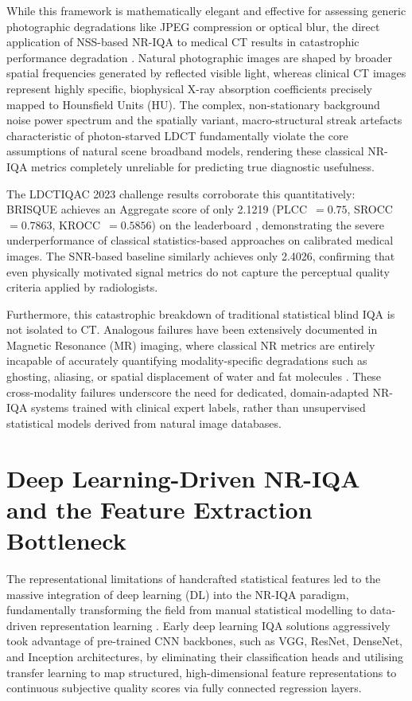 While this framework is mathematically elegant and effective for assessing generic
photographic degradations like JPEG compression or optical blur, the direct application of
NSS-based NR-IQA to medical CT results in catastrophic performance degradation
\cite{athar2019comprehensive}. Natural photographic images are shaped by broader spatial
frequencies generated by reflected visible light, whereas clinical CT images represent
highly specific, biophysical X-ray absorption coefficients precisely mapped to Hounsfield
Units (HU). The complex, non-stationary background noise power spectrum and the
spatially variant, macro-structural streak artefacts characteristic of photon-starved
LDCT fundamentally violate the core assumptions of natural scene broadband models,
rendering these classical NR-IQA metrics completely unreliable for predicting true
diagnostic usefulness.

The LDCTIQAC 2023 challenge results corroborate this quantitatively: BRISQUE achieves an
Aggregate score of only 2.1219 (PLCC~$= 0.75$, SROCC~$= 0.7863$, KROCC~$= 0.5856$)
on the leaderboard \cite{lee2025ldctiqac}, demonstrating the severe underperformance of
classical statistics-based approaches on calibrated medical images. The SNR-based baseline
similarly achieves only 2.4026, confirming that even physically motivated signal metrics
do not capture the perceptual quality criteria applied by radiologists.

Furthermore, this catastrophic breakdown of traditional statistical blind IQA is not
isolated to CT. Analogous failures have been extensively documented in Magnetic Resonance
(MR) imaging, where classical NR metrics are entirely incapable of accurately quantifying
modality-specific degradations such as ghosting, aliasing, or spatial displacement of
water and fat molecules \cite{stepien2023mri}. These cross-modality failures underscore
the need for dedicated, domain-adapted NR-IQA systems trained with clinical expert labels,
rather than unsupervised statistical models derived from natural image databases.


\section{Deep Learning-Driven NR-IQA and the Feature Extraction Bottleneck}
\label{sec:lit_dl_iqa}

The representational limitations of handcrafted statistical features led to the massive
integration of deep learning (DL) into the NR-IQA paradigm, fundamentally transforming
the field from manual statistical modelling to data-driven representation learning
\cite{ahmed2024iqanrtl}. Early deep learning IQA solutions aggressively took advantage
of pre-trained CNN backbones, such as VGG, ResNet, DenseNet, and Inception architectures,
by eliminating their classification heads and utilising transfer learning to map structured,
high-dimensional feature representations to continuous subjective quality scores via
fully connected regression layers.

